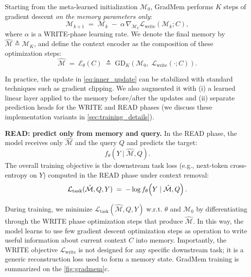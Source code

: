 \documentclass{article}
\theoremstyle{plain}
\theoremstyle{definition}
\theoremstyle{remark}
\begin{document}
Starting from the meta-learned initialization $\mathcal{M}_0$, GradMem performs $K$ steps of gradient descent \emph{on the memory parameters only}:
\begin{equation}
\mathcal{M}_{k+1}
\;=\;
\mathcal{M}_k \;-\; \alpha \, \nabla_{\mathcal{M}_k}\mathcal{L}_{\text{write}}(\mathcal{M}_k; C), 
\label{eq:inner_update}
\end{equation}
where $\alpha$ is a WRITE-phase learning rate.
We denote the final memory by $\hat{\mathcal{M}} \triangleq \mathcal{M}_K$, and define the context encoder as the composition of these optimization steps:
\begin{equation}
\hat{\mathcal{M}} \;=\; \mathcal{E}_\theta(C) \;\triangleq\; \mathrm{GD}_K\!\left(\mathcal{M}_0,\; \mathcal{L}_{\text{write}}(\cdot; C)\right).
\end{equation}
{In practice, the update in \cref{eq:inner_update} can be stabilized with standard techniques such as gradient clipping. We also augmented it with (i) a learned linear layer applied to the memory before/after the updates and (ii) separate prediction heads for the WRITE and READ phases (we discuss these implementation variants in \cref{sec:training_details}).

\textbf{READ: predict only from memory and query.}
In the READ phase, the model receives only $\hat{\mathcal{M}}$ and the query $Q$ and predicts the target:
\begin{equation}
f_\theta(Y \mid \hat{\mathcal{M}}, Q).
\label{eq:read_def}
\end{equation}
The overall training objective is the downstream task loss (e.g., next-token cross-entropy on $Y$) computed in the READ phase under context removal:
\begin{equation}
\mathcal{L}_{\text{task}}(\hat{\mathcal{M}}, Q, Y)
\;=\;
-\log f_\theta\!\left(Y \mid \hat{\mathcal{M}}, Q\right).
\label{eq:task_loss}
\vspace{-0.1in}
\end{equation}

During training, we minimize $\mathcal{L}_{\text{task}}(\hat{\mathcal{M}}, Q, Y)$ w.r.t. $\theta$ and $\mathcal{M}_0$ by differentiating through the WRITE phase optimization steps that produce $\hat{\mathcal{M}}$. In this way, the model learns to use few gradient descent optimization steps as operation to write useful information about current context $C$ into memory.
Importantly, the WRITE objective $\mathcal{L}_{\text{write}}$ is not designed for any specific downstream task; it is a generic reconstruction loss used to form a memory state. GradMem training is summarized on the \cref{fig:gradmem}c.

}
\end{document}

